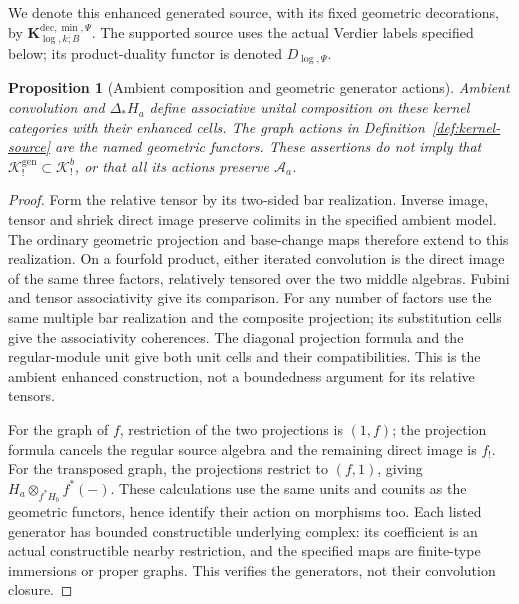 \documentclass[11pt]{article}
\newtheorem{proposition}{Proposition}[section]
\theoremstyle{definition}
\theoremstyle{remark}
\begin{document}
We denote this enhanced generated source, with its fixed geometric
decorations, by $\mathbf K_{\log,k;B}^{\mathrm{dec},\min,\Psi}$.
The supported source uses the actual Verdier labels specified below;
its product-duality functor is denoted $D_{\log,\Psi}$.


\begin{proposition}[Ambient composition and geometric generator actions]
\label{prop:ambient-kernel-types}
Ambient convolution and $\Delta_*H_a$ define associative unital
composition on these kernel categories with their enhanced cells.
The graph actions in Definition~\ref{def:kernel-source} are the named
geometric functors.  These assertions do not imply that
$\mathscr K_!^{\mathrm{gen}}\subset\mathscr K_!^b$, or that all its
actions preserve $\mathcal A_a$.
\end{proposition}
\begin{proof}
Form the relative tensor by its two-sided bar realization.
Inverse image, tensor and shriek direct image preserve colimits in
the specified ambient model.  The ordinary geometric projection and
base-change maps therefore extend to this realization.  On a fourfold
product, either iterated convolution is the direct image of the same
three factors, relatively tensored over the two middle algebras.
Fubini and tensor associativity give its comparison.  For any number
of factors use the same multiple bar realization and the composite
projection; its substitution cells give the associativity coherences.
The diagonal projection formula and the regular-module unit give both
unit cells and their compatibilities.  This is the ambient enhanced
construction, not a boundedness argument for its relative tensors.

For the graph of $f$, restriction of the two projections is $(1,f)$;
the projection formula cancels the regular source algebra and the
remaining direct image is $f_!$.  For the transposed graph, the
projections restrict to $(f,1)$, giving
$H_a\otimes_{f^*H_b}f^*(-)$.  These calculations use the same units
and counits as the geometric functors, hence identify their action
on morphisms too.  Each listed generator has bounded constructible
underlying complex: its coefficient is an actual constructible nearby
restriction, and the specified maps are finite-type immersions or
proper graphs.  This verifies the generators, not their convolution
closure.
\end{proof}
\end{document}
